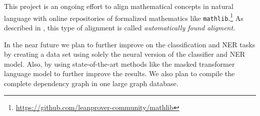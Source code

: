 \documentclass[submission,copyright,creativecommons]{eptcs}
\begin{document}
This project is an ongoing effort to align mathematical concepts
in natural language with  online repositories of formalized
mathematics like
\texttt{mathlib}.\footnote{\url{https://github.com/leanprover-community/mathlib}} 
As described in \cite{DBLP:conf/cikm/KaliszykKMR16}, this type of alignment is called \emph{automatically found aligment}.

In the near future we plan to further improve on the classification 
and NER tasks by creating a data set using solely the neural version
of the classifier and NER model. Also,  by using state-of-the-art
methods like the masked transformer language model \cite{DBLP:conf/naacl/DevlinCLT19} to
further improve the results. 
We also plan to compile the complete dependency graph in one 
large graph database. 








\end{document}
